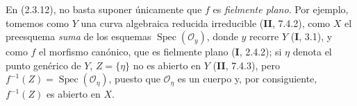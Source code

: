 \begin{remark}[2.3.15]
\label{IV.2.3.15-fr}
En (2.3.12), no basta suponer únicamente que $f$ es \emph{fielmente plano}. Por
ejemplo, tomemos como $Y$ una curva algebraica reducida irreducible
(\textbf{II}, 7.4.2), como $X$ el preesquema \emph{suma} de los esquemas
$\operatorname{Spec}(\mathcal O_y)$, donde $y$ recorre $Y$ (\textbf I, 3.1), y como
$f$ el morfismo canónico, que es fielmente plano (\textbf I, 2.4.2); si $\eta$ denota
el punto genérico de $Y$, $Z=\{\eta\}$ no es abierto en $Y$ (\textbf{II}, 7.4.3),
pero $f^{-1}(Z)=\operatorname{Spec}(\mathcal O_\eta)$, puesto que
$\mathcal O_\eta$ es un cuerpo y, por consiguiente, $f^{-1}(Z)$ es abierto
en $X$.
\end{remark}
